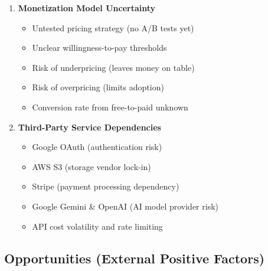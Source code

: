 \begin{enumerate}
    \item \textbf{Monetization Model Uncertainty}
          \begin{itemize}
              \item Untested pricing strategy (no A/B tests yet)
              \item Unclear willingness-to-pay thresholds
              \item Risk of underpricing (leaves money on table)
              \item Risk of overpricing (limits adoption)
              \item Conversion rate from free-to-paid unknown
          \end{itemize}

    \item \textbf{Third-Party Service Dependencies}
          \begin{itemize}
              \item Google OAuth (authentication risk)
              \item AWS S3 (storage vendor lock-in)
              \item Stripe (payment processing dependency)
              \item Google Gemini \& OpenAI (AI model provider risk)
              \item API cost volatility and rate limiting
          \end{itemize}
\end{enumerate}

\subsection{Opportunities (External Positive Factors)}

